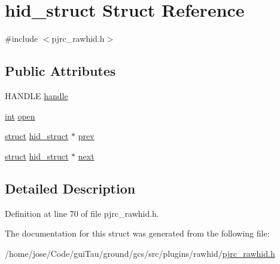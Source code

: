 \hypertarget{structhid__struct}{\section{hid\-\_\-struct Struct Reference}
\label{structhid__struct}
}


{\ttfamily \#include $<$pjrc\-\_\-rawhid.\-h$>$}

\subsection*{Public Attributes}
\begin{DoxyCompactItemize}
\item 
H\-A\-N\-D\-L\-E \hyperlink{group___raw_h_i_d_plugin_ga525aec9724c39727f65905e53be6a973}{handle}
\item 
\hyperlink{ioapi_8h_a787fa3cf048117ba7123753c1e74fcd6}{int} \hyperlink{group___raw_h_i_d_plugin_gac3065ab2f0080eb3fe182cad3fff15ee}{open}
\item 
\hyperlink{sdlgamepad_8dox_aba655c5729da86df745f0c8e7f9ba8d2}{struct} \hyperlink{structhid__struct}{hid\-\_\-struct} $\ast$ \hyperlink{group___raw_h_i_d_plugin_gac0d9fa3480e665ae9aca8a621a1dc66d}{prev}
\item 
\hyperlink{sdlgamepad_8dox_aba655c5729da86df745f0c8e7f9ba8d2}{struct} \hyperlink{structhid__struct}{hid\-\_\-struct} $\ast$ \hyperlink{group___raw_h_i_d_plugin_gafe069ce715c9b005340052f4ea9f1a62}{next}
\end{DoxyCompactItemize}


\subsection{Detailed Description}


Definition at line 70 of file pjrc\-\_\-rawhid.\-h.



The documentation for this struct was generated from the following file\-:\begin{DoxyCompactItemize}
\item 
/home/jose/\-Code/gui\-Tau/ground/gcs/src/plugins/rawhid/\hyperlink{pjrc__rawhid_8h}{pjrc\-\_\-rawhid.\-h}\end{DoxyCompactItemize}
